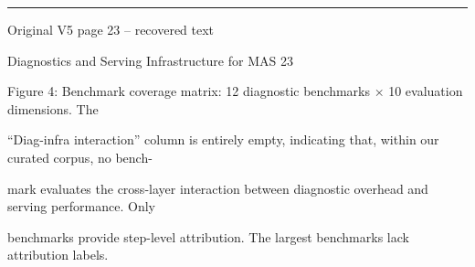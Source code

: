 \par\smallskip\noindent\rule{\textwidth}{0.4pt}\par{\sffamily\footnotesize Original V5 page 23 -- recovered text}\par\begin{flushleft}\footnotesize\ttfamily
\par\smallskip
\par\smallskip
\noindent Diagnostics and Serving Infrastructure for MAS 23\par
\par\smallskip
\par\smallskip
\par\smallskip
\par\smallskip
\noindent Figure 4: Benchmark coverage matrix: 12 diagnostic benchmarks × 10 evaluation dimensions. The\par
\noindent “Diag-infra interaction” column is entirely empty, indicating that, within our curated corpus, no bench-\par
\noindent mark evaluates the cross-layer interaction between diagnostic overhead and serving performance. Only\par
{} benchmarks provide step-level attribution. The largest benchmarks lack attribution labels.\par
\end{flushleft}
